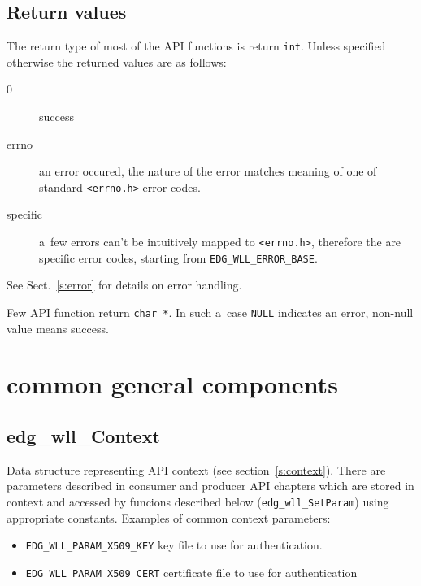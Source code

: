 \subsection{Return values}
The return type of most of the API functions is return \verb'int'.
Unless specified otherwise the returned values are as follows:
\begin{description}
\item[0] success
\item[errno] an error occured, the nature of the error
matches meaning of one of standard \verb'<errno.h>' error codes.
\item[\LB specific] a~few errors can't be intuitively mapped to
\verb'<errno.h>', therefore the are specific \LB error codes, starting from \verb'EDG_WLL_ERROR_BASE'.
\end{description}
See Sect.~\ref{s:error} for details on error handling.

Few API function return \verb'char *'. In such a~case \verb'NULL' indicates
an error, non-null value means success.

\section{\LB common general components}
\label{s:common}

\subsection{edg\_wll\_Context} 
\label{s:edg_wll_context}
Data structure representing \LB API context (see
section~\ref{s:context}).  There are parameters described in consumer
and producer API chapters which are stored in context and accessed by
funcions described below (\texttt{edg\_wll\_SetParam}) using
appropriate constants. Examples of common context parameters:
\begin{itemize}
  \item \texttt{EDG\_WLL\_PARAM\_X509\_KEY} key file to use for authentication.
  \item \texttt{EDG\_WLL\_PARAM\_X509\_CERT} certificate file to use for
      authentication
\end{itemize}



